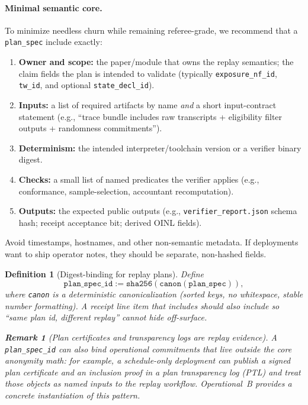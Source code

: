 \documentclass[11pt]{article}
\newtheorem{definition}{Definition}
\newtheorem{remark}{Remark}
\begin{document}
\paragraph{Minimal semantic core.}
To minimize needless churn while remaining referee-grade, we recommend that a \texttt{plan\_spec} include exactly:
\begin{enumerate}[leftmargin=*]
\item \textbf{Owner and scope:} the paper/module that owns the replay semantics; the claim fields the plan is intended to validate (typically \texttt{exposure\_nf\_id}, \texttt{tw\_id}, and optional \texttt{state\_decl\_id}).
\item \textbf{Inputs:} a list of required artifacts by name \emph{and} a short input-contract statement (e.g., ``trace bundle includes raw transcripts + eligibility filter outputs + randomness commitments'').
\item \textbf{Determinism:} the intended interpreter/toolchain version or a verifier binary digest.
\item \textbf{Checks:} a small list of named predicates the verifier applies (e.g., conformance, sample-selection, accountant recomputation).
\item \textbf{Outputs:} the expected public outputs (e.g., \texttt{verifier\_report.json} schema hash; receipt acceptance bit; derived OINL fields).
\end{enumerate}
Avoid timestamps, hostnames, and other non-semantic metadata.
If deployments want to ship operator notes, they should be separate, non-hashed fields.

\begin{definition}[Digest-binding for replay plans]
Define
\[\texttt{plan\_spec\_id} := \texttt{sha256}(\texttt{canon}(\texttt{plan\_spec})),\]
where \texttt{canon} is a deterministic canonicalization (sorted keys, no whitespace, stable number formatting).
A receipt line item that includes  should also include  so ``same plan id, different replay'' cannot hide off-surface.\cite{series:receiptitems,series:workedexample}
\begin{remark}[Plan certificates and transparency logs are replay evidence]
A \texttt{plan\_spec\_id} can also bind operational commitments that live outside the core anonymity math: for example,
a schedule-only deployment can publish a signed plan certificate and an inclusion proof in a plan transparency log (PTL) and treat those objects as named inputs to the replay workflow.
Operational~B provides a concrete instantiation of this pattern.\cite{series:operationalB}
\end{remark}

\end{definition}
\end{document}
